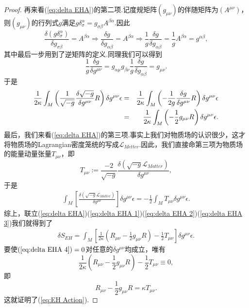 \begin{proof}
            再来看(\ref{eq:delta EHA})的第二项.记度规矩阵$(g_{\mu\nu})$的伴随矩阵为$(A^{\mu\nu})$，则$(g_{\mu\nu})$的行列式$g$满足$g\delta_\sigma^\alpha=g_{\sigma\beta}A^{\beta\alpha}$.因此
            $$\frac{\delta \left(g\delta_\sigma^\alpha\right)}{\delta g_{\sigma\beta}}=A^{\beta\alpha}\Rightarrow\frac{\delta g}{\delta g_{\alpha\beta}}=A^{\beta\alpha}\Rightarrow\frac{1}{g}\frac{\delta g}{\delta g_{\alpha\beta}}=\frac{1}{g}A^{\beta\alpha}=g^{\alpha\beta},$$
            其中最后一步用到了逆矩阵的定义.同理我们可以得到
            $$\frac{1}{g}\frac{\delta g}{\delta g^{\mu\nu}}=g_{\alpha\mu}g_{\beta\nu}\frac{1}{g}\frac{\delta g}{\delta g_{\alpha\beta}}=g_{\mu\nu}.$$
            于是
            \begin{eqnarray}\label{eq:delta EHA 2}
                \frac{1}{2\kappa}\int_M\left(\frac{1}{\sqrt{-g}}\frac{\delta\sqrt{-g}}{\delta g^{\mu\nu}}R\right)\delta g^{\mu\nu}\epsilon&=&\frac{1}{2\kappa}\int_M\left(-\frac{1}{2g}\frac{\delta g}{\delta g^{\mu\nu}}R\right)\delta g^{\mu\nu}\epsilon\notag\\
                &=&\frac{1}{2\kappa}\int_M\left(-\frac{1}{2}g_{\mu\nu}R\right)\delta g^{\mu\nu}\epsilon.
            \end{eqnarray}
            最后，我们来看(\ref{eq:delta EHA})的第三项.事实上我们对物质场的认识很少，这才将物质场的Lagrangian密度笼统的写成$\mathcal{L}_{Metter}$.因此，我们直接命第三项为物质场的能量动量张量$T_{\mu\nu}$，即
            $$T_{\mu\nu}:=\frac{-2}{\sqrt{-g}}\frac{\delta\left(\sqrt{-g}\mathcal{L} _{Matter}\right)}{\delta g^{\mu\nu}},$$
            于是
            \begin{eqnarray}\label{eq:delta EHA 3}
                \int_M\left[\frac{\delta\left(\sqrt{-g}\mathcal{L}_{Matter}\right)}{\delta g^{\mu\nu}}\right]\delta g^{\mu\nu}\epsilon=-\frac{1}{2}\int_MT_{\mu\nu}\delta g^{\mu\nu}\epsilon.
            \end{eqnarray}
            综上，联立(\ref{eq:delta EHA})(\ref{eq:delta EHA 1})(\ref{eq:delta EHA 2})(\ref{eq:delta EHA 3})我们就得到了
            \begin{eqnarray}\label{eq:delta EHA 4}
                \delta S_{EH}=\int_M\left[\frac{1}{2\kappa}\left(R_{\mu\nu}-\frac{1}{2}g_{\mu\nu}R\right)-\frac{1}{2}T_{\mu\nu}\right]\delta g^{\mu\nu}\epsilon.
            \end{eqnarray}
            要使$(\ref{eq:delta EHA 4})=0$对任意的$\delta g^{\mu\nu}$均成立，唯有
            $$\frac{1}{2\kappa}\left(R_{\mu\nu}-\frac{1}{2}g_{\mu\nu}R\right)-\frac{1}{2}T_{\mu\nu}\equiv0,$$
            即
            $$R_{\mu\nu}-\frac{1}{2}g_{\mu\nu}R=\kappa T_{\mu\nu}.$$
            这就证明了(\ref{eq:EH Action}).
        \end{proof}
